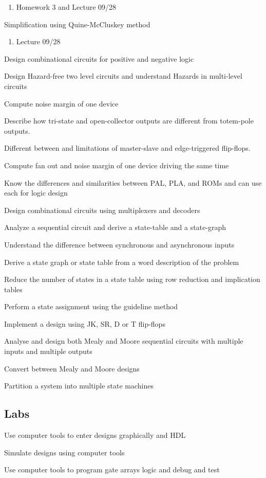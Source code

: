\begin{todolist}
    \begin{enumerate}
      \item Homework 3 and Lecture 09/28 
    \end{enumerate}
  \item[\done]  Simplification using Quine-McCluskey method
    \begin{enumerate}
    \item Lecture 09/28 
    \end{enumerate}
  \item[\done]  Design combinational circuits for positive and negative logic
  \item[\done]  Design Hazard-free two level circuits and understand Hazards in multi-level circuits
  \item[\done] Compute noise margin of one device
  \item[\done] Describe how tri-state and open-collector outputs are different from totem-pole outputs.
  \item[\done] Different between and limitations of master-slave and edge-triggered flip-flops.
  \item Compute fan out and noise margin of one device driving the same time
  \item Know the differences and similarities between PAL, PLA, and ROMs and can use each for logic design
  \item Design combinational circuits using multiplexers and decoders
  \item Analyze a sequential circuit and derive a state-table and a state-graph
  \item Understand the difference between synchronous and asynchronous inputs
  \item Derive a state graph or state table from a word description of the problem
  \item Reduce the number of states in a state table using row reduction and implication tables
  \item Perform a state assignment using the guideline method
  \item Implement a design using JK, SR, D or T flip-flops
  \item Analyse and design both Mealy and Moore sequential circuits with multiple inputs and multiple outputs
  \item Convert between Mealy and Moore designs
  \item Partition a system into multiple state machines
\end{todolist}

\subsection{Labs}
\begin{todolist}
  \item[\done] Use computer tools to enter designs graphically and HDL
  \item Simulate designs using computer tools
  \item Use computer tools to program gate arrays logic and debug and test
\end{todolist}

\newpage
